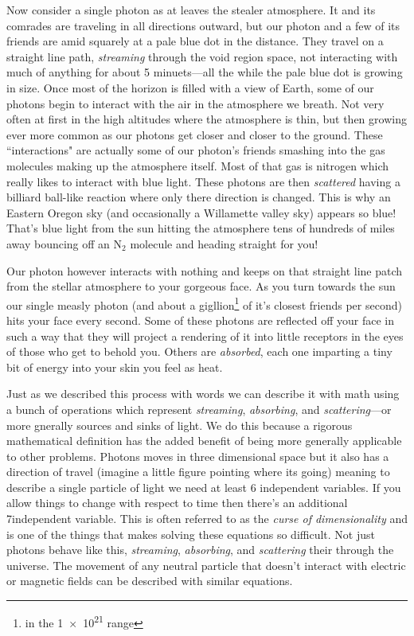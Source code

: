Now consider a single photon as at leaves the stealer atmosphere.
It and its comrades are traveling in all directions outward, but our photon and a few of its friends are amid squarely at a pale blue dot in the distance.
They travel on a straight line path, \textit{streaming} through the void region space, not interacting with much of anything for about 5 minuets---all the while the pale blue dot is growing in size.
Once most of the horizon is filled with a view of Earth, some of our photons begin to interact with the air in the atmosphere we breath.
Not very often at first in the high altitudes where the atmosphere is thin, but then growing ever more common as our photons get closer and closer to the ground.
These ``interactions" are actually some of our photon's friends smashing into the gas molecules making up the atmosphere itself.
Most of that gas is nitrogen which really likes to interact with blue light.
These photons are then \textit{scattered} having a billiard ball-like reaction where only there direction is changed.
This is why an Eastern Oregon sky (and occasionally a Willamette valley sky) appears so blue!
That's blue light from the sun hitting the atmosphere tens of hundreds of miles away bouncing off an N$_2$ molecule and heading straight for you!

Our photon however interacts with nothing and keeps on that straight line patch from the stellar atmosphere to your gorgeous face.
As you turn towards the sun our single measly photon (and about a gigllion\footnote{in the \num{1e21} range} of it's closest friends per second) hits your face every second.
Some of these photons are reflected off your face in such a way that they will project a rendering of it into little receptors in the eyes of those who get to behold you.
Others are \textit{absorbed}, each one imparting a tiny bit of energy into your skin you feel as heat.

Just as we described this process with words we can describe it with math using a bunch of operations which represent \textit{streaming}, \textit{absorbing}, and \textit{scattering}---or more gnerally sources and sinks of light.
We do this because a rigorous mathematical definition has the added benefit of being more generally applicable to other problems.
Photons moves in three dimensional space but it also has a direction of travel (imagine a little figure pointing where its going) meaning to describe a single particle of light we need at least 6 independent variables.
If you allow things to change with respect to time then there's an additional 7\ths independent variable.
This is often referred to as the \textit{curse of dimensionality} and is one of the things that makes solving these equations so difficult.
Not just photons behave like this, \textit{streaming}, \textit{absorbing}, and \textit{scattering} their through the universe.
The movement of any neutral particle that doesn't interact with electric or magnetic fields can be described with similar equations.

